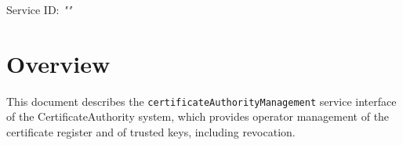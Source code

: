 \documentclass[a4paper]{arrowhead}
\begin{document}
\sloppy

\ArrowheadSetup

\begin{center}
  \vspace*{1cm}
  \huge{\arrowtitle}

  \vspace*{0.2cm}
  \LARGE{\arrowtype}
  \vspace*{1cm}

  \Large{Service ID: \textit{"\arrowid"}}

  \vspace*{\fill}


  \vspace*{1cm}
  \vspace*{\fill}

  \begin{abstract}
    This document describes the HTTP/1.1 protocol with TLS payload security and JSON payload encoding variant of the \texttt{certificate\allowbreak{}Authority\allowbreak{}Management} service of the CertificateAuthority system.
  \end{abstract}

  \vspace*{1cm}
\end{center}

\newpage

\tableofcontents
\newpage

\section{Overview}
\label{sec:overview}

This document describes the \texttt{certificate\allowbreak{}Authority\allowbreak{}Management} service interface of the CertificateAuthority system, which provides operator management of the certificate register and of trusted keys, including revocation.
\end{document}
